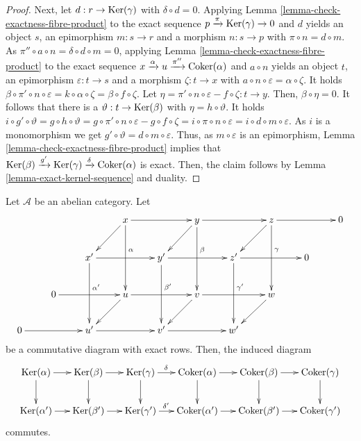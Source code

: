 \begin{proof}
\medskip\noindent
Next, let $d : r \to \mathop{\mathrm{Ker}}(\gamma)$ with $\delta \circ d = 0$. Applying
Lemma \ref{lemma-check-exactness-fibre-product} to the exact sequence
$p \xrightarrow{\pi} \mathop{\mathrm{Ker}}(\gamma) \to 0$ and $d$ yields an object $s$,
an epimorphism $m : s \to r$ and a morphism $n : s \to p$ with
$\pi \circ n = d \circ m$. As
$\pi'' \circ a \circ n = \delta \circ d \circ m = 0$,
applying Lemma \ref{lemma-check-exactness-fibre-product} to the exact sequence
$x \xrightarrow{\alpha} u \xrightarrow{\pi''} \mathop{\mathrm{Coker}}(\alpha)$ and
$a \circ n$ yields an object $t$, an epimorphism $\varepsilon : t \to s$ and
a morphism $\zeta : t \to x$ with
$a \circ n \circ \varepsilon = \alpha \circ \zeta$.
It holds
$\beta \circ \pi' \circ n \circ \varepsilon =
k \circ \alpha \circ \zeta = \beta \circ f \circ \zeta$.
Let $\eta = \pi' \circ n \circ \varepsilon - f \circ \zeta : t \to y$. Then,
$\beta \circ \eta = 0$. It follows that there is a
$\vartheta : t \to \mathop{\mathrm{Ker}}(\beta)$ with $\eta = h \circ \vartheta$. It holds
$i \circ g' \circ \vartheta = g \circ h \circ \vartheta =
g \circ \pi' \circ n \circ \varepsilon - g \circ f \circ \zeta =
i \circ \pi \circ n \circ \varepsilon = i \circ d \circ m \circ \varepsilon$.
As $i$ is a monomorphism we get
$g' \circ \vartheta = d \circ m \circ \varepsilon$.
Thus, as $m \circ \varepsilon$ is an epimorphism,
Lemma \ref{lemma-check-exactness-fibre-product} implies that
$\mathop{\mathrm{Ker}}(\beta) \xrightarrow{g'} \mathop{\mathrm{Ker}}(\gamma) \xrightarrow{\delta} \mathop{\mathrm{Coker}}(\alpha)$
is exact. Then, the claim follows by Lemma \ref{lemma-exact-kernel-sequence}
and duality.
\end{proof}

\begin{lemma}
\label{lemma-snake-natural}
Let $\mathcal{A}$ be an abelian category. Let 
$$
\xymatrix{
& & & x\ar[ld]\ar[rr]\ar[dd]^(.4)\alpha
& & y\ar[ld]\ar[rr]\ar[dd]^(.4)\beta
& & z\ar[ld]\ar[rr]\ar[dd]^(.4)\gamma
& & 0\\
& & x'\ar[rr]\ar[dd]^(.4){\alpha'}
& & y'\ar[rr]\ar[dd]^(.4){\beta'}
& & z'\ar[rr]\ar[dd]^(.4){\gamma'}
& & 0
& \\
& 0\ar[rr]
& & u\ar[ld]\ar[rr]
& & v\ar[ld]\ar[rr]
& & w\ar[ld]
& & \\
0\ar[rr]
& & u'\ar[rr]
& & v'\ar[rr]
& & w'
& & &
}
$$
be a commutative diagram with exact rows. Then, the induced diagram
$$
\xymatrix@C=15pt{
\Ker(\alpha) \ar[r] \ar[d] &
\Ker(\beta) \ar[r] \ar[d] &
\Ker(\gamma) \ar[r]^(.45){\delta} \ar[d] &
\Coker(\alpha) \ar[r] \ar[d] &
\Coker(\beta) \ar[r] \ar[d] &
\Coker(\gamma) \ar[d] \\
\Ker(\alpha') \ar[r] &
\Ker(\beta') \ar[r] &
\Ker(\gamma') \ar[r]^(.45){\delta'} &
\Coker(\alpha') \ar[r] &
\Coker(\beta') \ar[r] &
\Coker(\gamma')
}
$$
commutes.
\end{lemma}

